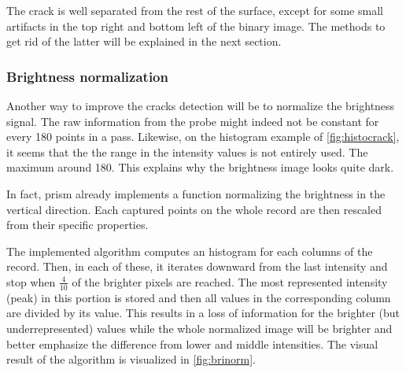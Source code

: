 The crack is well separated from the rest of the surface, except for some small artifacts in the top right and bottom left of the binary image. The methods to get rid of the latter will be explained in the next section.

\subsubsection{Brightness normalization}
\label{sec:brinorm}

Another way to improve the cracks detection will be to normalize the brightness signal. The raw information from the probe might indeed not be constant for every 180 points in a pass. Likewise, on the histogram example of \autoref{fig:histocrack}, it seems that the the range in the intensity values is not entirely used. The maximum around 180. This explains why the brightness image looks quite dark.

In fact, \gls{prism} already implements a function normalizing the brightness in the vertical direction. Each captured points on the whole record are then rescaled from their specific properties.

The implemented algorithm computes an histogram for each columns of the record. Then, in each of these, it iterates downward from the last intensity and stop when $\frac{4}{10}$ of the brighter pixels are reached. The most represented intensity (peak) in this portion is stored and then all values in the corresponding column are divided by its value. This results in a loss of information for the brighter (but underrepresented) values while the whole normalized image will be brighter and better emphasize the difference from lower and middle intensities. The visual result of the algorithm is visualized in \autoref{fig:brinorm}.

